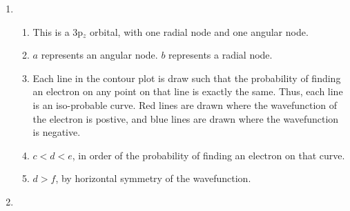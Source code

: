 \documentclass[10pt]{article}
\begin{document}
\begin{enumerate}
                \item
                \begin{enumerate}
                        \item This is a 3p$_z$ orbital, with one radial node and one angular node.
                        \item $a$ represents an angular node. $b$ represents a radial node.
                        \item Each line in the contour plot is draw such that the probability of finding an electron on any point
                        on that line is exactly the same. Thus, each line is an iso-probable curve.
                        Red lines are drawn where the wavefunction of the electron is postive, and blue lines are drawn where the
                        wavefunction is negative.
                        \item $c < d < e$, in order of the probability of finding an electron on that curve.
                        \item $d > f$, by horizontal symmetry of the wavefunction.
                \end{enumerate}
                
                \item 
                
        \end{enumerate}
\end{document}
